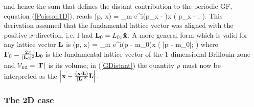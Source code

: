 \documentclass[letterpaper]{article}
\newcommand{\wt}{\widetilde}
\newcommand{\vbGamma}{\boldsymbol{\Gamma}}
\begin{document}
and hence the sum that defines the distant contribution
to the periodic GF, equation (\ref{Poisson1D}), reads
{
  (\vb p, \vb x) 
  = \sum_{m} e^{i(p_x - )x}
   \wt{G\sups{long}}\Big( p_x - ; \rho\Big).
}
This derivation assumed that the fundamental lattice vector was aligned 
with the positive $x$-direction, i.e. I had $\mathbf{L}_0=L_{0x}\mathbf{\hat x}$.
A more general form which is valid for any lattice vector $\mathbf{L}$
is 
{
  (\vb p, \vb x)
  =
   \sum_{m} e^{i(\vb p - m\vbGamma_0)\cdot \vb x}
          \wt{G\sups{long}}\Big( \big|\vb p - m\vbGamma_0\big|; \rho\Big)
}
where $\vbGamma_0=\frac{2\pi}{|\vb L_0|^2}\vb L_0$ 
is the fundamental lattice vector of the 1-dimensional
Brillouin zone and 
$\mc V\subt{BZ}=|\vbGamma|$ is its volume; in (\ref{GDistant}) 
the quantity $\rho$ must now be interpreted as the 
$\left| \mathbf{x} - \frac{(\mathbf{x} \cdot \mathbf{L})}{|\mathbf{L}|^2}\mathbf{L}\right|.$

\subsubsection{The 2D case}
\end{document}
